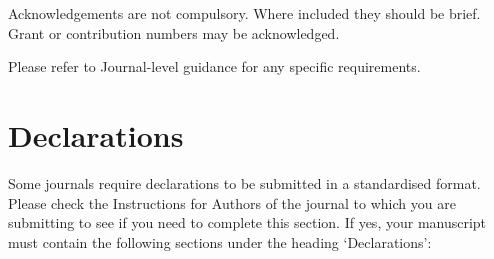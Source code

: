 \documentclass[pdflatex,sn-mathphys-num]{sn-jnl}%
\theoremstyle{thmstyleone}%
\theoremstyle{thmstyletwo}%
\theoremstyle{thmstylethree}%
\begin{document}











Acknowledgements are not compulsory. Where included they should be brief. Grant or contribution numbers may be acknowledged.

Please refer to Journal-level guidance for any specific requirements.

\section*{Declarations}

Some journals require declarations to be submitted in a standardised format. Please check the Instructions for Authors of the journal to which you are submitting to see if you need to complete this section. If yes, your manuscript must contain the following sections under the heading `Declarations':
\end{document}
